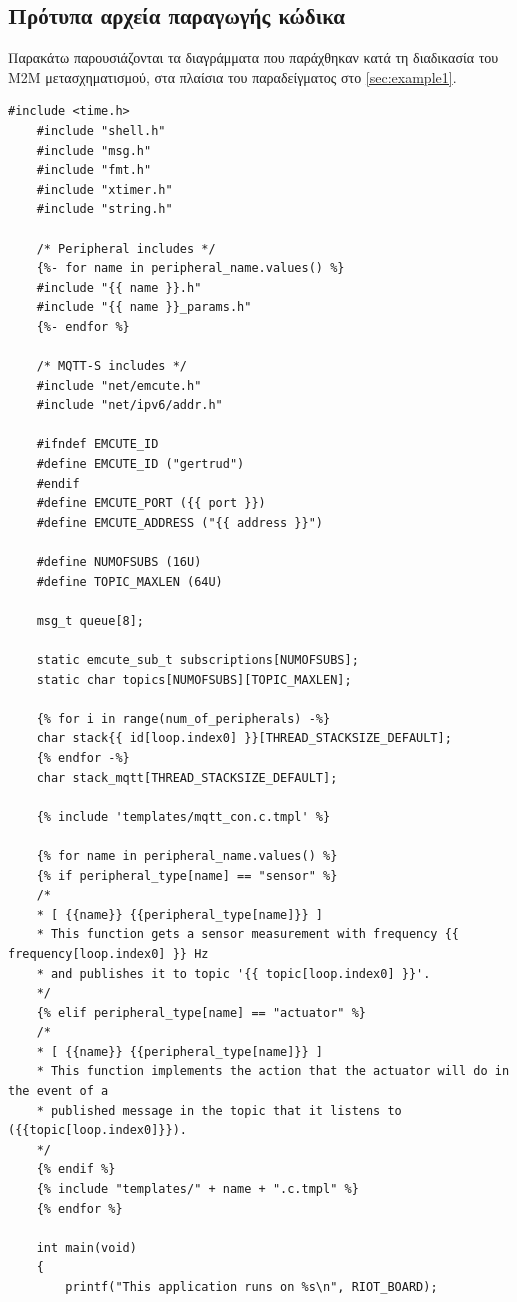 \begin{appendices}
	
\chapter{Πρότυπα αρχεία παραγωγής κώδικα}
\label{appendix:templates}

Παρακάτω παρουσιάζονται τα διαγράμματα που παράχθηκαν κατά τη διαδικασία του M2M μετασχηματισμού, στα πλαίσια του παραδείγματος στο \autoref{sec:example1}.

\begin{lstlisting}[style=CStyle, title={Κύριο πρότυπο που καλεί και όλα τα υπόλοιπα}]
	#include <time.h>
	#include "shell.h"
	#include "msg.h"
	#include "fmt.h"
	#include "xtimer.h"
	#include "string.h"
	
	/* Peripheral includes */
	{%- for name in peripheral_name.values() %}
	#include "{{ name }}.h"
	#include "{{ name }}_params.h"
	{%- endfor %}
		
	/* MQTT-S includes */
	#include "net/emcute.h"
	#include "net/ipv6/addr.h"
	
	#ifndef EMCUTE_ID
	#define EMCUTE_ID ("gertrud")
	#endif
	#define EMCUTE_PORT ({{ port }})
	#define EMCUTE_ADDRESS ("{{ address }}")
	
	#define NUMOFSUBS (16U)
	#define TOPIC_MAXLEN (64U)
	
	msg_t queue[8];
	
	static emcute_sub_t subscriptions[NUMOFSUBS];
	static char topics[NUMOFSUBS][TOPIC_MAXLEN];
	
	{% for i in range(num_of_peripherals) -%}
	char stack{{ id[loop.index0] }}[THREAD_STACKSIZE_DEFAULT];
	{% endfor -%}
	char stack_mqtt[THREAD_STACKSIZE_DEFAULT];
	
	{% include 'templates/mqtt_con.c.tmpl' %}
		
	{% for name in peripheral_name.values() %}
	{% if peripheral_type[name] == "sensor" %}
	/*
	* [ {{name}} {{peripheral_type[name]}} ] 
	* This function gets a sensor measurement with frequency {{ frequency[loop.index0] }} Hz 
	* and publishes it to topic '{{ topic[loop.index0] }}'.
	*/
	{% elif peripheral_type[name] == "actuator" %}
	/*
	* [ {{name}} {{peripheral_type[name]}} ] 
	* This function implements the action that the actuator will do in the event of a 
	* published message in the topic that it listens to ({{topic[loop.index0]}}).
	*/
	{% endif %}
	{% include "templates/" + name + ".c.tmpl" %}
	{% endfor %}
	
	int main(void)
	{
		printf("This application runs on %s\n", RIOT_BOARD);
		

\end{lstlisting}
\end{appendices}

